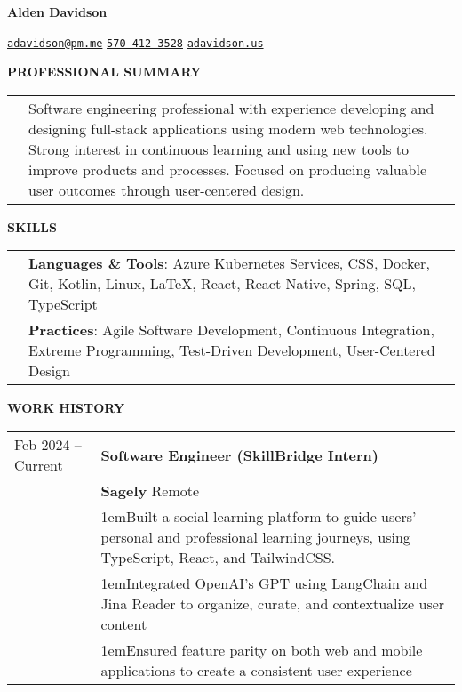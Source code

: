 \documentclass[11pt]{article}
\newlength{\dateColumnWidth}
\newcommand{\customBulletLabel}{\raisebox{0.4ex}{\tiny$\bullet$}}
\newcommand{\detail}{\par\noindent\makebox[1em][l]{\customBulletLabel}\hangindent1em}
\begin{document}
\begin{center}
    \begin{minipage}{0.70\textwidth}
        {\Huge\textbf{Alden Davidson}}
    \end{minipage}%
    \begin{minipage}{0.30\textwidth}
        \raggedleft
        \href{mailto:adavidson@pm.me}{\nolinkurl{adavidson@pm.me}}
        \href{tel:5704123528}{\nolinkurl{570-412-3528}}
        \href{https://adavidson.us}{\nolinkurl{adavidson.us}}
    \end{minipage}
\end{center}
{\Large \textbf{PROFESSIONAL SUMMARY}}
\bigbreak
\begin{tabularx}{\textwidth}{@{}p{\dateColumnWidth}X@{}}
     & Software engineering professional with experience developing and designing full-stack applications using modern web technologies.
    Strong interest in continuous learning and using new tools to improve products and processes.
    Focused on producing valuable user outcomes through user-centered design.
\end{tabularx}
\bigbreak
{\Large \textbf{SKILLS}}
\bigbreak
\begin{tabularx}{\textwidth}{@{}p{\dateColumnWidth}X@{}}
     & \textbf{Languages \& Tools}: Azure Kubernetes Services, CSS, Docker, Git, Kotlin, Linux, \LaTeX, React, React Native, Spring, SQL, TypeScript \\
     & \textbf{Practices}: Agile Software Development, Continuous Integration, Extreme Programming, Test-Driven Development, User-Centered Design    \\
\end{tabularx}
\bigbreak
{\Large \textbf{WORK HISTORY}}
\bigbreak
\begin{tabularx}{\textwidth}{@{}p{\dateColumnWidth}X@{}}
    Feb 2024 -- Current & \textbf{Software Engineer (SkillBridge Intern)}                                                                                                 \\
                        & \textbf{Sagely} \textbar{} Remote                                                                                                               \\
                        & \detail Built a social learning platform to guide users' personal and professional learning journeys, using TypeScript, React, and TailwindCSS. \\
                        & \detail Integrated OpenAI's GPT using LangChain and Jina Reader to organize, curate, and contextualize user content                             \\
                        & \detail Ensured feature parity on both web and mobile applications to create a consistent user experience                                       \\
\end{tabularx}
\end{document}
